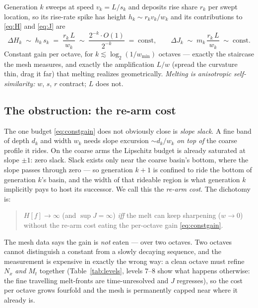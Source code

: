 \documentclass[11pt]{article}
\begin{document}
Generation $k$ sweeps at speed $v_k=L/s_k$ and deposits rise share $r_k$
per swept location, so its rise-rate spike has height
$h_k\sim r_k v_k/w_k$ and its contributions to \eqref{eq:H} and
\eqref{eq:J} are
\begin{equation}
\label{eq:constgain}
\Delta H_k\;\sim\; h_k\,s_k\;=\;\frac{r_k\,L}{w_k}\;\sim\;
\frac{2^{-k}\cdot O(1)}{2^{-k}}\;=\;\text{const},
\qquad
\Delta J_k\;\sim\; m_k\,\frac{r_k\,L}{w_k}\;\sim\;\text{const}.
\end{equation}
Constant gain per octave, for $k\lesssim\log_2(1/w_{\min})$ octaves ---
exactly the staircase the mesh measures, and exactly the amplification
$L/w$ (spread the curvature thin, drag it far) that melting realizes
geometrically. \emph{Melting is anisotropic self-similarity:} $w$, $s$,
$r$ contract; $L$ does not.

\subsection{The obstruction: the re-arm cost}
\label{sec:rearm}

The one budget \eqref{eq:constgain} does not obviously close is
\emph{slope slack}. A fine band of depth $d_k$ and width $w_k$ needs slope
excursion $\sim d_k/w_k$ \emph{on top of} the coarse profile it rides. On
the coarse arms the Lipschitz budget is already saturated at slope
$\pm1$: zero slack. Slack exists only near the coarse basin's bottom,
where the slope passes through zero --- so generation $k{+}1$ is confined
to ride the bottom of generation $k$'s basin, and the width of that
rideable region is what generation $k$ implicitly pays to host its
successor. We call this the \emph{re-arm cost}. The dichotomy is:

\begin{quote}
$H[f]\to\infty$ (and $\sup J=\infty$) \emph{iff} the melt can keep
sharpening ($w\to0$) without the re-arm cost eating the per-octave gain
\eqref{eq:constgain}.
\end{quote}

The mesh data says the gain is \emph{not} eaten --- over two octaves. Two
octaves cannot distinguish a constant from a slowly decaying sequence, and
the measurement is expensive in exactly the wrong way: a clean octave must
refine $N_x$ \emph{and} $M_t$ together (Table~\ref{tab:levels}, levels
7--8 show what happens otherwise: the fine travelling melt-fronts are
time-unresolved and $J$ regresses), so the cost per octave grows
fourfold and the mesh is permanently capped near where it already is.
\end{document}
